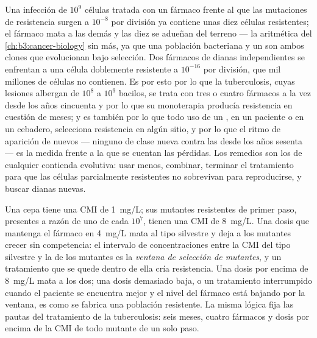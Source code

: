 \begin{proposition}\label{prop:b3:bacteriology:selection}
Una infección de $10^{9}$ células tratada con un fármaco frente al que
las mutaciones de resistencia surgen a $10^{-8}$ por división ya contiene
unas diez células resistentes; el fármaco mata a las demás y las diez se
adueñan del terreno --- la aritmética del \cref{ch:b3:cancer-biology} sin
más, ya que una población bacteriana y un  son ambos clones que
evolucionan bajo selección. Dos fármacos de dianas independientes se
enfrentan a una célula doblemente resistente a $10^{-16}$ por división,
que mil millones de células no contienen. Es por esto por lo que la
tuberculosis, cuyas lesiones albergan de $10^{8}$ a $10^{9}$ bacilos, se
trata con tres o cuatro fármacos a la vez desde los años cincuenta y por
lo que su monoterapia producía resistencia en cuestión de meses; y es
también por lo que todo uso de un , en un paciente o en un
cebadero, selecciona resistencia en algún sitio, y por lo que el ritmo de
aparición de  nuevos --- ninguno de clase nueva contra las
 desde los años sesenta --- es la medida frente a la que se
cuentan las pérdidas. Los remedios son los de cualquier contienda
evolutiva: usar menos, combinar, terminar el tratamiento para que las
células parcialmente resistentes no sobrevivan para reproducirse, y
buscar dianas nuevas.
\end{proposition}

\begin{example}\label{ex:b3:bacteriology:window}
Una cepa tiene una CMI de \qty{1}{mg/L}; sus mutantes resistentes de
primer paso, presentes a razón de uno de cada $10^{7}$, tienen una CMI de
\qty{8}{mg/L}. Una dosis que mantenga el fármaco en \qty{4}{mg/L} mata al
tipo silvestre y deja a los mutantes crecer sin competencia: el intervalo
de concentraciones entre la CMI del tipo silvestre y la de los mutantes
es la \emph{ventana de selección de mutantes}, y un tratamiento que se
quede dentro de ella cría resistencia. Una dosis por encima de
\qty{8}{mg/L} mata a los dos; una dosis demasiado baja, o un tratamiento
interrumpido cuando el paciente se encuentra mejor y el nivel del fármaco
está bajando por la ventana, es como se fabrica una población resistente.
La misma lógica fija las pautas del tratamiento de la tuberculosis: seis
meses, cuatro fármacos y dosis por encima de la CMI de todo mutante de un
solo paso.
\end{example}

